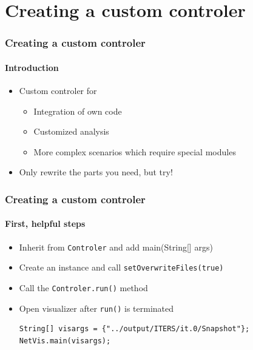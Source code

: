 \section{Creating a custom controler}

\begin{frame}
\frametitle{Creating a custom controler}
\framesubtitle{Introduction}
\begin{itemize}
  \item Custom controler for
    \begin{itemize}
  	  \item Integration of own code
  	  \item Customized analysis
  	  \item More complex scenarios which require special modules
    \end{itemize}
  \item Only rewrite the parts you need, but try!
\end{itemize}
\end{frame}


\begin{frame}[fragile]
\frametitle{Creating a custom controler}
\framesubtitle{First, helpful steps}
\begin{itemize}
  \item Inherit from \verb|Controler| and add main(String[] args)
  \item Create an instance and call \verb|setOverwriteFiles(true)|
  \item Call the \verb|Controler.run()| method
  \item Open visualizer after \verb|run()| is terminated
  \begin{verbatim}
String[] visargs = {"../output/ITERS/it.0/Snapshot"};
NetVis.main(visargs);\end{verbatim}
\end{itemize}

\end{frame}


